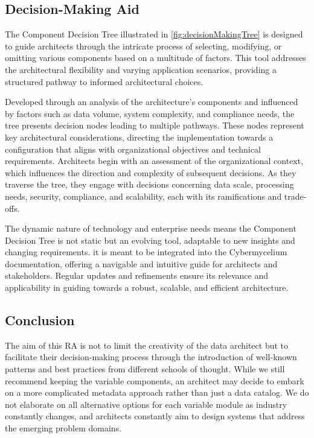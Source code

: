 \documentclass[review]{elsarticle}
\begin{document}
\subsection{Decision-Making Aid}

The Component Decision Tree illustrated in \ref{fig:decisionMakingTree} is designed to guide architects through the intricate process of selecting, modifying, or omitting various components based on a multitude of factors. This tool addresses the architectural flexibility and varying application scenarios, providing a structured pathway to informed architectural choices.

Developed through an analysis of the architecture's components and influenced by factors such as data volume, system complexity, and compliance needs, the tree presents decision nodes leading to multiple pathways. These nodes represent key architectural considerations, directing the implementation towards a configuration that aligns with organizational objectives and technical requirements. Architects begin with an assessment of the organizational context, which influences the direction and complexity of subsequent decisions. As they traverse the tree, they engage with decisions concerning data scale, processing needs, security, compliance, and scalability, each with its ramifications and trade-offs.

The dynamic nature of technology and enterprise needs means the Component Decision Tree is not static but an evolving tool, adaptable to new insights and changing requirements. it is meant to be integrated into the Cybermycelium documentation, offering a navigable and intuitive guide for architects and stakeholders. Regular updates and refinements ensure its relevance and applicability in guiding towards a robust, scalable, and efficient architecture.


\subsection{Conclusion}


The aim of this RA is not to limit the creativity of the data architect but to facilitate their decision-making process through the introduction of well-known patterns and best practices from different schools of thought. While we still recommend keeping the variable components, an architect may decide to embark on a more complicated metadata approach rather than just a data catalog. We do not elaborate on all alternative options for each variable module as industry constantly changes, and architects constantly aim to design systems that address the emerging problem domains. 
\end{document}
